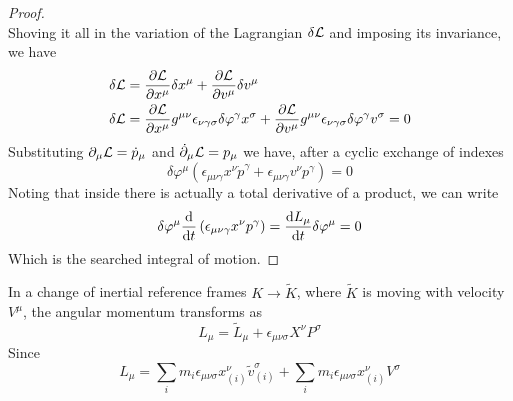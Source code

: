 \documentclass[../admech.tex]{subfiles}
\begin{document}
\begin{proof}
\begin{equation}
		\label{eq:velvar}
	\end{equation}
	Shoving it all in the variation of the Lagrangian $\delta\mathcal{L}$ and imposing its invariance, we have
	\begin{equation}
		\begin{aligned}
			\delta\mathcal{L}&=\pdv{\mathcal{L}}{x^\mu}\delta x^\mu+\pdv{\mathcal{L}}{v^\mu}\delta v^\mu\\
			\delta\mathcal{L}&=\pdv{\mathcal{L}}{x^\mu}g^{\mu\nu}\epsilon_{\nu\gamma\sigma}\delta\varphi^\gamma x^\sigma+\pdv{\mathcal{L}}{v^\mu}g^{\mu\nu}\epsilon_{\nu\gamma\sigma}\delta\varphi^\gamma v^\sigma=0
		\end{aligned}
		\label{eq:lagvarang}
	\end{equation}
	Substituting $\partial_\mu\mathcal{L}=\dot{p}_\mu$ and $\dot{\partial}_\mu\mathcal{L}=p_\mu$ we have, after a cyclic exchange of indexes
	\begin{equation}
		\delta\varphi^\mu\left( \epsilon_{\mu\nu\gamma}x^\nu\dot{p}^\gamma+\epsilon_{\mu\nu\gamma}v^\nu p^\gamma \right)=0
		\label{eq:var}
	\end{equation}
	Noting that inside there is actually a total derivative of a product, we can write
	\begin{equation}
		\delta\varphi^\mu\dv{t}\left( \epsilon_{\mu\nu\gamma}x^\nu p^\gamma \right)=\dv{L_\mu}{t}\delta\varphi^\mu=0
	\end{equation}
	Which is the searched integral of motion.
\end{proof}
In a change of inertial reference frames $K\to\tilde{K}$, where $\tilde{K}$ is moving with velocity $V^\mu$, the angular momentum transforms as
\begin{equation}
	L_\mu=\tilde{L}_\mu+\epsilon_{\mu\nu\sigma}X^\nu P^\sigma
	\label{eq:angmomchange}
\end{equation}
Since
\begin{equation*}
	L_\mu=\sum_im_i\epsilon_{\mu\nu\sigma}x^\nu_{(i)}\tilde{v}_{(i)}^\sigma+\sum_{i}m_i\epsilon_{\mu\nu\sigma}x^\nu_{(i)}V^\sigma
\end{equation*}
\end{document}
